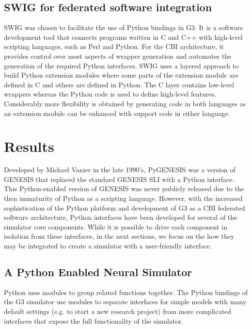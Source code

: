 \documentclass[12pt]{article}
\begin{document}
\subsection{SWIG for federated software integration}

SWIG was chosen to facilitate the use of Python bindings in G3. It is
a software development tool that connects programs written in C and
C++ with high-level scripting languages, such as Perl and Python. For
the CBI architecture, it provides control over most aspects of wrapper
generation and automates the generation of the required Python
interfaces. SWIG uses a layered approach to build Python extension
modules where some parts of the extension module are defined in C and
others are defined in Python. The C layer contains low-level wrappers
whereas the Python code is used to define high-level features.
Considerably more flexibility is obtained by generating code in both
languages as an extension module can be enhanced with support code in
either language.

\section{Results}

Developed by Michael Vanier in the late 1990's, PyGENESIS was a
version of GENESIS that replaced the standard GENESIS SLI with a
Python interface\cite{vanier97:_genes_python}.  This Python-enabled
version of GENESIS was never publicly released due to the then
immaturity of Python as a scripting language.  However, with the
increased sophistication of the Python platform and development of G3
as a CBI federated software architecture, Python interfaces have been
developed for several of the simulator core components.  While it is
possible to drive each component in isolation from these interfaces,
in the next sections, we focus on the how they may be integrated to
create a simulator with a user-friendly interface.

\subsection{A Python Enabled Neural Simulator}

Python uses modules to group related functions together.  The Python
bindings of the G3 simulator use modules to separate interfaces for
simple models with many default settings (e.g. to start a new research
project) from more complicated interfaces that expose the full
functionality of the simulator.
\end{document}
